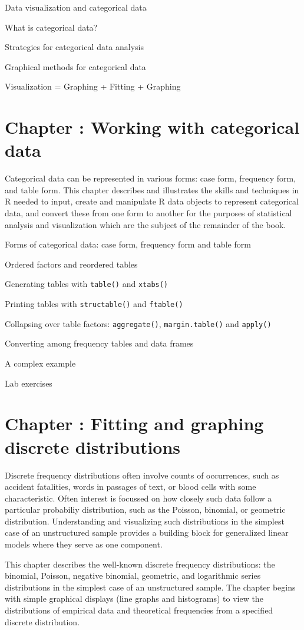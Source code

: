 \documentclass{article}
\newcommand{\Chapter}[1]{\section{Chapter \thesection: #1}}
\newcommand{\Section}[1]{\item #1}
\newcommand{\R}{\textsf{R}\xspace}
\newcommand{\code}[1]{\texttt{#1}}
\newcommand{\func}[1]{\code{#1()}}
\begin{document}
\begin{enumerate*}
	\Section{Data visualization and categorical data}
	\Section{What is categorical data?}
	\Section{Strategies for categorical data analysis}
	\Section{Graphical methods for categorical data}
	\Section{Visualization = Graphing + Fitting + Graphing}
\end{enumerate*}

\Chapter{Working with categorical data}\label{ch:working}

Categorical data can be represented in various forms:
case form, frequency form, and table form.  This chapter
describes and illustrates the skills and techniques in \R
needed to input, create and manipulate \R data objects
to represent categorical data, and convert these from one
form to another for the purposes of statistical analysis
and visualization which are the subject of the remainder of the book.


\begin{enumerate*}
	\Section Forms of categorical data: case form, frequency form and table form
	\Section Ordered factors and reordered tables
	\Section Generating tables with \func{table} and \func{xtabs}	
	\Section Printing tables with \func{structable} and \func{ftable}
	\Section Collapsing over table factors: \func{aggregate}, \func{margin.table} and \func{apply}
	\Section Converting among frequency tables and data frames
	\Section A complex example
  \Section Lab exercises
\end{enumerate*}

\Chapter{Fitting and graphing discrete distributions}\label{ch:discrete}

Discrete frequency distributions often involve counts of occurrences, such as accident fatalities,
words in passages of text, or blood cells with some characteristic.
Often interest is focussed on how closely such data follow a particular probabiliy distribution,
such as the Poisson, binomial, or geometric distribution.  Understanding and visualizing
such distributions
in the simplest case of an unstructured sample provides a building block for generalized
linear models where they serve as one component.

This chapter describes the well-known discrete
frequency distributions: the binomial, Poisson, negative binomial,
geometric, and logarithmic series distributions in the simplest case of an unstructured sample.
The chapter begins with simple graphical displays (line graphs and histograms) to view
the distributions of empirical data and theoretical frequencies from a specified
discrete distribution.
\end{document}

